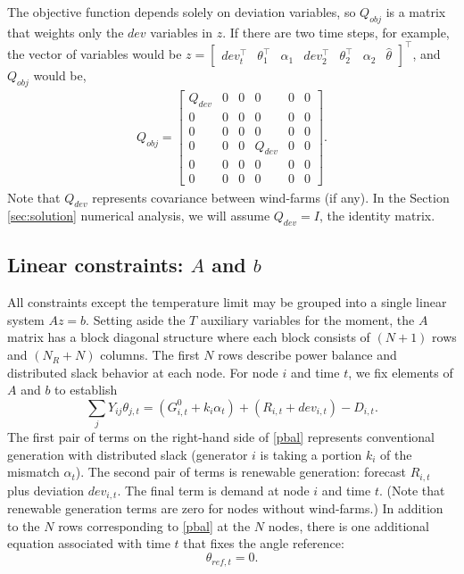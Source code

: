 \documentclass[conference]{IEEEtran}
\begin{document}
The objective function depends solely on deviation variables, so
$Q_{obj}$ is a matrix that weights only the $dev$ variables in $z$. If
there are two time steps, for example, the vector of variables would
be $z = \begin{bmatrix}dev_t^\top & \theta_1^\top & \alpha_1 &
  dev_2^\top & \theta_2^\top & \alpha_2 &
  \hat{\theta}\end{bmatrix}^\top$, and $Q_{obj}$ would be,
\begin{align*}
Q_{obj} = \begin{bmatrix} Q_{dev} & 0 & 0 & 0 & 0 & 0 \\ 0 & 0 & 0 & 0 & 0 & 0 \\ 0 & 0  & 0 & 0 & 0 & 0 \\ 0 & 0 & 0 & Q_{dev} & 0 & 0 \\ 0 & 0 & 0 & 0 & 0 & 0 \\ 0 & 0 & 0 & 0 & 0 & 0\end{bmatrix}.
\end{align*}
Note that $Q_{dev}$ represents covariance between wind-farms (if any). In the Section \ref{sec:solution} numerical analysis, we will assume $Q_{dev}=I$, the identity matrix.

\subsection{Linear constraints: $A$ and $b$}\label{sec:Ax=b}

All constraints except the temperature limit may be grouped into a single linear system $Az=b$. Setting aside the $T$ auxiliary variables for the moment, the $A$ matrix has a block diagonal structure where each block consists of $(N+1)$ rows and $(N_R+N)$ columns. The first $N$ rows describe power balance and distributed slack behavior at each node. For node $i$ and time $t$, we fix elements of $A$ and $b$ to establish
\begin{equation}\label{pbal}
\sum\limits_{j} Y_{ij}\theta_{j,t}  = (G_{i,t}^0 + k_i\alpha_t) +
(R_{i,t} + dev_{i,t}) - D_{i,t}.
\end{equation}
The first pair of terms on the right-hand side of \eqref{pbal}
represents conventional generation with distributed slack (generator
$i$ is taking a portion $k_i$ of the mismatch $\alpha_t$). The second
pair of terms is renewable generation: forecast $R_{i,t}$ plus
deviation $dev_{i,t}$. The final term is demand at node $i$ and time
$t$. (Note that renewable generation terms are zero for nodes without
wind-farms.) In addition to the $N$ rows corresponding to \eqref{pbal}
at the $N$ nodes, there is one additional equation associated with
time $t$ that fixes the angle reference:
\begin{equation}\label{mismatch}
\theta_{ref,t} = 0.
\end{equation}
\end{document}

